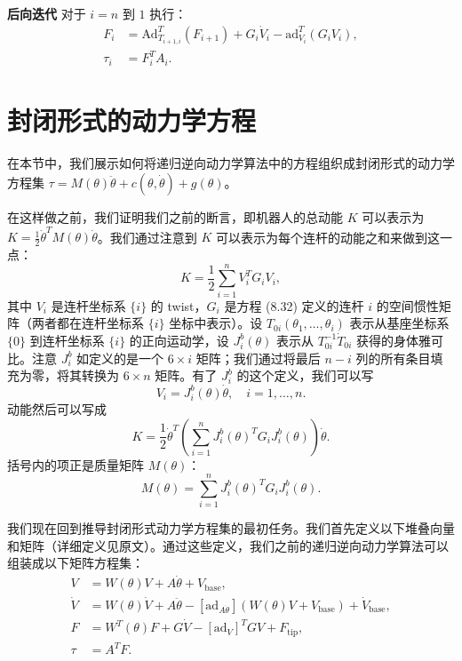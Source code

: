 \documentclass[12pt,a4paper]{article}
\begin{document}
\textbf{后向迭代} 对于 $i = n$ 到 $1$ 执行：
\begin{align}
F_i &= \text{Ad}_{T_{i+1,i}}^T(F_{i+1}) + G_i \dot{V}_i - \text{ad}_{V_i}^T(G_i V_i), \label{eq:8.53} \\
\tau_i &= F_i^T A_i. \label{eq:8.54}
\end{align}

\section{封闭形式的动力学方程}
在本节中，我们展示如何将递归逆向动力学算法中的方程组织成封闭形式的动力学方程集 $\tau = M(\theta)\ddot{\theta} + c(\theta, \dot{\theta}) + g(\theta)$。

在这样做之前，我们证明我们之前的断言，即机器人的总动能 $K$ 可以表示为 $K = \frac{1}{2}\dot{\theta}^T M(\theta)\dot{\theta}$。我们通过注意到 $K$ 可以表示为每个连杆的动能之和来做到这一点：
\begin{equation}
K = \frac{1}{2}\sum_{i=1}^{n} V_i^T G_i V_i, \label{eq:8.55}
\end{equation}
其中 $V_i$ 是连杆坐标系 $\{i\}$ 的 twist，$G_i$ 是方程 (8.32) 定义的连杆 $i$ 的空间惯性矩阵（两者都在连杆坐标系 $\{i\}$ 坐标中表示）。设 $T_{0i}(\theta_1, \ldots, \theta_i)$ 表示从基座坐标系 $\{0\}$ 到连杆坐标系 $\{i\}$ 的正向运动学，设 $J_i^b(\theta)$ 表示从 $T_{0i}^{-1}\dot{T}_{0i}$ 获得的身体雅可比。注意 $J_i^b$ 如定义的是一个 $6 \times i$ 矩阵；我们通过将最后 $n-i$ 列的所有条目填充为零，将其转换为 $6 \times n$ 矩阵。有了 $J_i^b$ 的这个定义，我们可以写
\begin{equation}
V_i = J_i^b(\theta)\dot{\theta}, \quad i = 1, \ldots, n.
\end{equation}
动能然后可以写成
\begin{equation}
K = \frac{1}{2}\dot{\theta}^T\left(\sum_{i=1}^{n} J_i^b(\theta)^T G_i J_i^b(\theta)\right)\dot{\theta}. \label{eq:8.56}
\end{equation}
括号内的项正是质量矩阵 $M(\theta)$：
\begin{equation}
M(\theta) = \sum_{i=1}^{n} J_i^b(\theta)^T G_i J_i^b(\theta). \label{eq:8.57}
\end{equation}

我们现在回到推导封闭形式动力学方程集的最初任务。我们首先定义以下堆叠向量和矩阵（详细定义见原文）。通过这些定义，我们之前的递归逆向动力学算法可以组装成以下矩阵方程集：
\begin{align}
V &= W(\theta)V + A\dot{\theta} + V_{\text{base}}, \label{eq:8.68} \\
\dot{V} &= W(\theta)\dot{V} + A\ddot{\theta} - [\text{ad}_{A\dot{\theta}}](W(\theta)V + V_{\text{base}}) + \dot{V}_{\text{base}}, \label{eq:8.69} \\
F &= W^T(\theta)F + G\dot{V} - [\text{ad}_V]^T GV + F_{\text{tip}}, \label{eq:8.70} \\
\tau &= A^T F. \label{eq:8.71}
\end{align}
\end{document}
